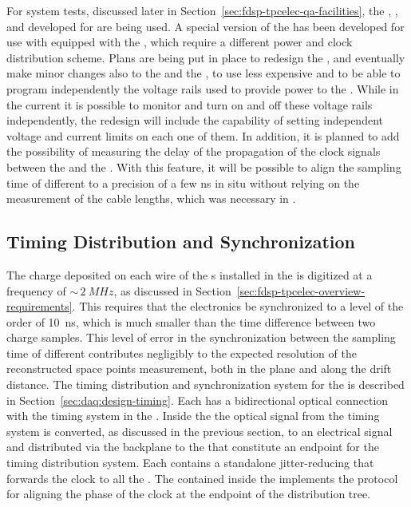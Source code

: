 For system tests, discussed later in Section~\ref{sec:fdsp-tpcelec-qa-facilities},
the , , and  developed for 
are being used. A special version of the  has been developed
for use with  equipped with the  ,
which require a different power and clock distribution scheme. Plans are
being put in place to redesign the , and eventually make 
minor changes also to the  and the , to use 
less expensive  and to be able to program independently
the voltage rails used to provide power to the . While in
the current  it is possible to monitor and turn on and off
these voltage rails independently, the redesign will include the
capability of setting independent voltage and current limits on each
one of them. In addition, it is planned to add the possibility of measuring
the delay of the propagation
of the clock signals between the  and the . With
this feature, it will be possible to align the sampling time of different
 to a precision of a few ns in situ without relying on the 
measurement of the cable lengths, which was necessary
in .


\subsection{Timing Distribution and Synchronization}
\label{sec:fdsp-tpcelec-design-timing}

The charge deposited on each wire of the s installed 
in the   is digitized at a frequency of
$\sim\,\SI{2}{MHz}$, as discussed in 
Section~\ref{sec:fdsp-tpcelec-overview-requirements}. This requires
that the  electronics be synchronized to a level of the order of \SI{10}{ns}, which is
much smaller than the time difference between two charge samples.
This level of error in the synchronization between the sampling time of different
 contributes negligibly to the expected resolution %
of the reconstructed space points measurement,
both in the  plane and along the drift distance.
The timing distribution and synchronization system for the 
 is described in Section~\ref{sec:daq:design-timing}.
Each  has a bidirectional optical connection with the
timing system in the . Inside the  the optical
signal from the timing system is converted, as discussed in the previous
section, to an electrical signal and distributed via the backplane to
the  that constitute an endpoint for the timing distribution
system. Each  contains a standalone jitter-reducing  
that forwards the clock to all the . The
 contained inside the  implements the 
protocol~\cite{bib:docdb1651,bib:docdb11233} for aligning
the phase of the clock at the endpoint of the distribution tree.

